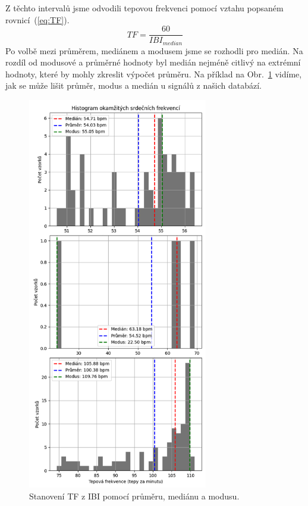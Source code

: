 Z těchto intervalů jsme odvodili tepovou frekvenci pomocí vztahu popsaném rovnicí~(\ref{eq:TF}).
\begin{equation}
	\label{eq:TF}
	TF = \frac{60}{IBI_{median}}
\end{equation}
Po volbě mezi průměrem, mediánem a modusem jsme se rozhodli pro medián.
Na rozdíl od modusové a průměrné hodnoty byl medián nejméně citlivý na extrémní hodnoty, které by mohly zkreslit výpočet průměru.
Na příklad na Obr.~\ref{fig:HR_hist} vidíme, jak se může lišit průměr, modus a medián u signálů z našich databází.

\begin{figure}[b]
	\centering
	\includegraphics[width=0.7\textwidth]{./obrazky/HR_Hist.png}
	\caption[Histogram IBI]{Stanovení TF z IBI pomocí průměru, mediánu a modusu.}
	\vspace{-5mm}
	\label{fig:HR_hist}
\end{figure}

